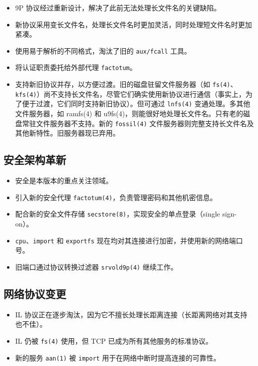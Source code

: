 \documentclass[12pt,UTF8]{ctexbook}
\begin{document}
\begin{itemize}
\item 9P 协议经过重新设计，解决了此前无法处理长文件名的关键缺陷。
\item 新协议采用变长文件名，处理长文件名时更加灵活，同时处理短文件名时更加紧凑。
\item 使用易于解析的不同格式，淘汰了旧的 \texttt{aux/fcall} 工具。
\item 将认证职责委托给外部代理 \texttt{factotum}。
\item 支持新旧协议并存，以方便过渡。旧的磁盘驻留文件服务器（如 \texttt{fs(4)}、\texttt{kfs(4)}）尚不支持长文件名，尽管它们确实使用新协议进行通信（事实上，为了便于过渡，它们同时支持新旧协议）。但可通过 \texttt{lnfs(4)} 变通处理。多其他文件服务器，如 ramfs(4) 和 u9fs(4)，则能很好地处理长文件名。只有老的磁盘常驻文件服务器不支持。新的 \texttt{fossil(4)} 文件服务器则完整支持长文件名及其他新特性。旧服务器现已弃用。
\end{itemize}

\subsection{安全架构革新}

\begin{itemize}
\item 安全是本版本的重点关注领域。
\item 引入新的安全代理 \texttt{factotum(4)}，负责管理密码和其他机密信息。
\item 配合新的安全文件存储 \texttt{secstore(8)}，实现安全的单点登录（single sign-on）。
\item \texttt{cpu}、\texttt{import} 和 \texttt{exportfs} 现在均对其连接进行加密，并使用新的网络端口号。
\item 旧端口通过协议转换过滤器 \texttt{srvold9p(4)} 继续工作。
\end{itemize}

\subsection{网络协议变更}

\begin{itemize}
\item IL 协议正在逐步淘汰，因为它不擅长处理长距离连接（长距离网络对其支持也不佳）。
\item IL 仍被 \texttt{fs(4)} 使用，但 TCP 已成为所有其他服务的标准协议。
\item 新的服务 \texttt{aan(1)} 被 \texttt{import} 用于在网络中断时提高连接的可靠性。
\end{itemize}
\end{document}
